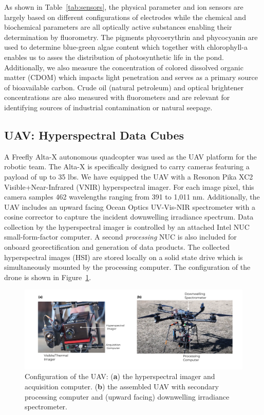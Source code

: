 \documentclass[sensors,article,submit,pdftex,moreauthors]{Definitions/mdpi}
\begin{document}
As shown in Table~\ref{tab:sensors}, the physical parameter and ion sensors are largely based on different configurations of electrodes while the chemical and biochemical parameters are all optically active substances enabling their determination by fluorometry. The pigments phycoerythrin and phycocyanin are used to determine blue-green algae content which together with chlorophyll-a enables us to asses the distribution of photosynthetic life in the pond. Additionally, we also measure the concentration of colored dissolved organic matter (CDOM) which impacts light penetration and serves as a primary source of bioavailable carbon. Crude oil (natural petroleum) and optical brightener concentrations are also measured with fluorometers and are relevant for identifying sources of industrial contamination or natural seepage.

\subsection{UAV: Hyperspectral Data Cubes}

A Freefly Alta-X autonomous quadcopter was used as the UAV platform for the robotic team. The Alta-X is specifically designed to carry cameras featuring a payload of up to 35 lbs. We have equipped the UAV with a Resonon Pika XC2 Visible+Near-Infrared (VNIR) hyperspectral imager. For each image pixel, this camera samples 462 wavelengths ranging from 391 to 1,011 nm.  Additionally, the UAV includes an upward facing Ocean Optics UV-Vis-NIR spectrometer with a cosine corrector to capture the incident downwelling irradiance spectrum. Data collection by the hyperspectral imager is controlled by an attached Intel NUC small-form-factor computer. A second \textit{processing} NUC is also included for onboard georectification and generation of data products. The collected hyperspectral images (HSI) are stored locally on a solid state drive which is simultaneously mounted by the processing computer. The configuration of the drone is shown in Figure~\ref{fig:drone-components}.

\begin{figure}[H]
\includegraphics[width=\columnwidth]{paper/figures/materials-and-methods/annotated-drone.pdf}
\caption{Configuration of the UAV: (\textbf{a}) the hyperspectral imager and acquisition computer. (\textbf{b}) the assembled UAV with secondary processing computer and (upward facing) downwelling irradiance spectrometer. \label{fig:drone-components}}
\end{figure} 
\end{document}
